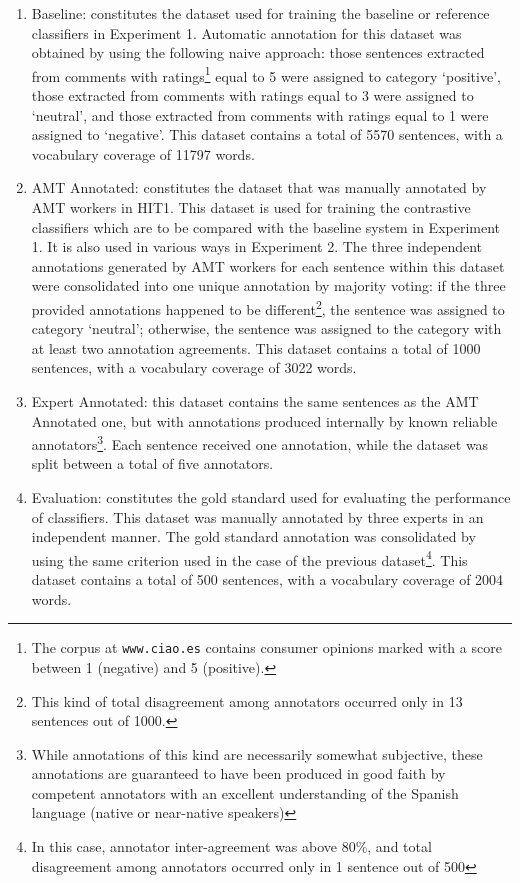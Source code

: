 \documentclass[11pt, a4paper,onecolumn]{article}
\begin{document}
\begin{enumerate}
\item Baseline: constitutes the dataset used for training the baseline or reference classifiers in Experiment 1. 
Automatic annotation for this dataset was obtained by using the following naive approach: those sentences extracted from
comments with ratings\footnote{The corpus at \texttt{www.ciao.es} contains consumer opinions marked with a score between 1 (negative) and 5 (positive).} equal to 5 were assigned to category `positive', those extracted from comments with ratings 
equal to 3 were assigned to `neutral', and those extracted from comments with ratings equal to 1 were assigned to
`negative'. This dataset contains a total of 5570 sentences, with a vocabulary coverage of 11797 words. 

\item AMT Annotated: constitutes the dataset that was manually annotated by AMT workers in HIT1.
This dataset is used for training the contrastive classifiers which are to be compared with the baseline system in Experiment 1.  It is also used in various ways in Experiment 2. 
The three independent annotations generated by AMT workers for each sentence within this dataset were consolidated into one unique annotation
by majority voting: if the three provided annotations happened to be
different\footnote{This kind of total disagreement among annotators occurred only in 13 sentences out of 1000.}, 
the sentence was assigned to category `neutral'; otherwise, the sentence was assigned to the category with
at least two annotation agreements. This dataset contains a total of 1000 sentences, with a vocabulary coverage 
of 3022 words. 

\item Expert Annotated: this dataset contains the same sentences as the AMT Annotated one, but with annotations produced internally by known reliable annotators\footnote{While annotations of this kind are necessarily somewhat subjective, these annotations are guaranteed to have been produced in good faith by competent annotators with an excellent understanding of the Spanish language (native or near-native speakers)}.  Each sentence received one annotation, while the dataset was split between a total of five annotators.

\item Evaluation: constitutes the gold standard used for evaluating the performance of classifiers.
This dataset was manually annotated by three experts in an independent manner. The gold standard annotation
was consolidated by using the same criterion used in the case of the previous dataset\footnote{In this case, 
annotator inter-agreement was above 80\%, and total disagreement among annotators occurred only in 1 sentence
out of 500}. This dataset contains a total of 500 sentences, with a vocabulary coverage of 2004 words.    
\end{enumerate} 
\end{document}
